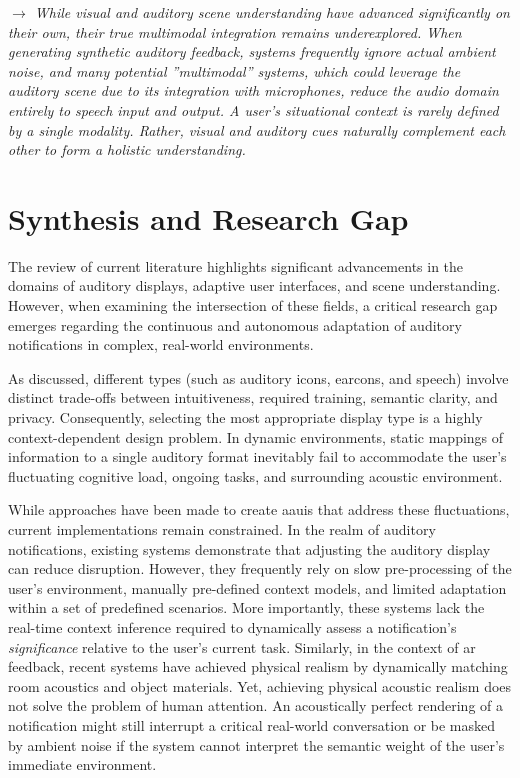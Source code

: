 \textit{$\rightarrow$ While visual and auditory scene understanding have advanced significantly on their own, their true multimodal integration remains underexplored. When generating synthetic auditory feedback, systems frequently ignore actual ambient noise, and many potential ''multimodal'' systems, which could leverage the auditory scene due to its integration with microphones, reduce the audio domain entirely to speech input and output. A user's situational context is rarely defined by a single modality. Rather, visual and auditory cues naturally complement each other to form a holistic understanding.}

\section{Synthesis and Research Gap}
The review of current literature highlights significant advancements in the domains of auditory displays, adaptive user interfaces, and scene understanding. However, when examining the intersection of these fields, a critical research gap emerges regarding the continuous and autonomous adaptation of auditory notifications in complex, real-world environments. 

As discussed, different \glspl{type} (such as auditory icons, earcons, and speech) involve distinct trade-offs between intuitiveness, required training, semantic clarity, and privacy. Consequently, selecting the most appropriate display type is a highly context-dependent design problem. In dynamic environments, static mappings of information to a single auditory format inevitably fail to accommodate the user's fluctuating cognitive load, ongoing tasks, and surrounding acoustic environment.

While approaches have been made to create \glspl{aaui} that address these fluctuations, current implementations remain constrained. In the realm of auditory notifications, existing systems demonstrate that adjusting the auditory display can reduce disruption. However, they frequently rely on slow pre-processing of the user’s environment, manually pre-defined context models, and limited adaptation within a set of predefined scenarios. More importantly, these systems lack the real-time context inference required to dynamically assess a notification's \textit{significance} relative to the user's current task. Similarly, in the context of \gls{ar} feedback, recent systems have achieved physical realism by dynamically matching room acoustics and object materials. Yet, achieving physical acoustic realism does not solve the problem of human attention. An acoustically perfect rendering of a notification might still interrupt a critical real-world conversation or be masked by ambient noise if the system cannot interpret the semantic weight of the user's immediate environment.

